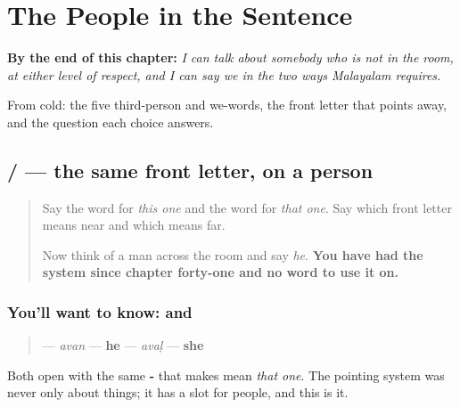 
\chapter{The People in the Sentence}
\label{ch:ml-aalukal}

\begin{chapteropening}
\textbf{By the end of this chapter:} \emph{I can talk about somebody who is not in the room, at either level of respect, and I can say we in the two ways Malayalam requires.}

From cold: the five third-person and we-words, the front letter that points away, and the question each choice answers.
\end{chapteropening}

\section[\texorpdfstring{\ml{അവൻ} / \ml{അവൾ} (avan / avaḷ)}{അവൻ / അവൾ (avan / avaḷ)}]{ /  — the same front letter, on a person}

\label{lesson:ML-C71-avan-aval}



\begin{quote}
Say the word for \emph{this one} and the word for \emph{that one}. Say which front letter means near and which means far.

Now think of a man across the room and say \emph{he}. \textbf{You have had the system since chapter forty-one and no word to use it on.}
\end{quote}

\subsection*{You'll want to know:  and }
\begin{quote}
\textbf{} — \emph{avan} — \textbf{he} \textbf{} — \emph{avaḷ} — \textbf{she}
\end{quote}

Both open with the same \textbf{-} that makes \textbf{} mean \emph{that one}. The pointing system was never only about things; it has a slot for people, and this is it.

